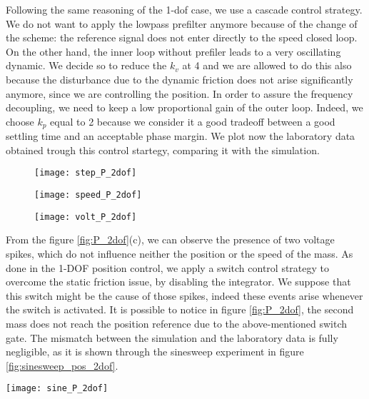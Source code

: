Following the same reasoning of the 1-dof case, we use a cascade control strategy. We do not want to apply the lowpass prefilter anymore because of the change of the scheme: the reference signal does not enter directly to the speed closed loop. On the other hand, the inner loop without prefiler leads to a very oscillating dynamic. We decide so to reduce the $k_v$ at 4 and we are allowed to do this also because the disturbance due to the dynamic friction does not arise significantly anymore, since we are controlling the position.
In order to assure the frequency decoupling, we need to keep a low proportional gain of the outer loop. Indeed, we choose $k_p$ equal to 2 because we consider it a good tradeoff between a good settling time and an acceptable phase margin.
\newline
We plot now the laboratory data obtained trough this control startegy, comparing it with the simulation.
\begin{figure*}[h]
	\centering
	\begin{subfigure}{0.48\columnwidth}
		\texttt{[image: step\_P\_2dof]}
	\end{subfigure}
	\begin{subfigure}{0.45\columnwidth}
		\texttt{[image: speed\_P\_2dof]}
	\end{subfigure}
	\begin{subfigure}{0.45\columnwidth}
		\texttt{[image: volt\_P\_2dof]}
	\end{subfigure}
	\caption{Position control loop with $k_{p} =2$ with a position step of $\frac{\pi}{4}$}
	\label{fig:P_2dof}
\end{figure*}

From the figure \ref{fig:P_2dof}(c), we can observe the presence of two voltage spikes, which do not influence neither the position or the speed of the mass. As done in the 1-DOF position control, we apply a switch control strategy to overcome the static friction issue, by disabling the integrator. We suppose that this switch might be the cause of those spikes, indeed these events arise whenever the switch is activated. 
It is possible to notice in figure \ref{fig:P_2dof}, the second mass does not reach the position reference due to the above-mentioned switch gate.
The mismatch between the simulation and the laboratory data is fully negligible, as it is shown through the sinesweep experiment in figure \ref{fig:sinesweep_pos_2dof}.
\begin{figure*}[h]
	\centering
	\texttt{[image: sine\_P\_2dof]}
	\caption{Sineweep experiment from 0.1 Hz to 1 Hz in 100s}
	\label{fig:sinesweep_pos_2dof}
\end{figure*}